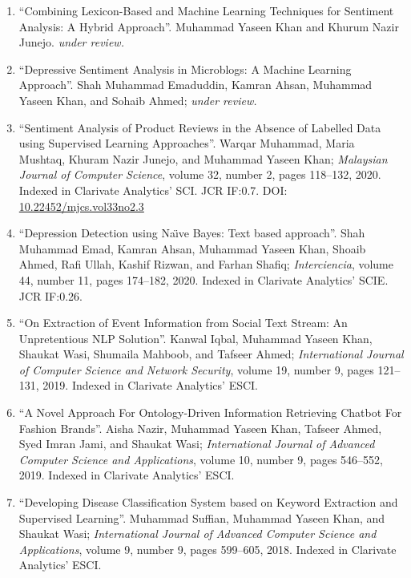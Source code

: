 \documentclass[a4paper, 10pt]{article}
\begin{document}
\begin{enumerate}
\itemsep-4pt 
	\item ``Combining Lexicon-Based and Machine Learning Techniques for Sentiment Analysis: A Hybrid Approach''. \textcolor{NavyBlue}{Muhammad Yaseen Khan} and Khurum Nazir Junejo. \emph{\small under review.}
       
	\item ``Depressive Sentiment Analysis in Microblogs: A Machine Learning Approach''. Shah Muhammad Emaduddin, Kamran Ahsan, \textcolor{NavyBlue}{Muhammad Yaseen Khan}, and Sohaib Ahmed; \emph{\small under review.}
       
    \item ``Sentiment Analysis of Product Reviews in the Absence of Labelled Data using Supervised Learning Approaches''. Warqar Muhammad, Maria Mushtaq, Khuram Nazir Junejo, and \textcolor{NavyBlue}{Muhammad Yaseen Khan}; \emph{Malaysian Journal of Computer Science}, volume 32, number 2, pages 118--132, 2020. Indexed in Clarivate Analytics' SCI. JCR IF:0.7. DOI: \href{10.22452/mjcs.vol33no2.3}{10.22452/mjcs.vol33no2.3}
    
    \item ``Depression Detection using Na\"{\i}ve Bayes: Text based approach''. Shah Muhammad Emad, Kamran Ahsan, \textcolor{NavyBlue}{Muhammad Yaseen Khan}, Shoaib Ahmed, Rafi Ullah, Kashif Rizwan, and Farhan Shafiq; \emph{Interciencia}, volume 44, number 11, pages 174--182, 2020. Indexed in Clarivate Analytics' SCIE. JCR IF:0.26.
	
	\item ``On Extraction of Event Information from Social Text Stream: An Unpretentious NLP Solution''. Kanwal Iqbal, \textcolor{NavyBlue}{Muhammad Yaseen Khan}, Shaukat Wasi, Shumaila Mahboob, and Tafseer Ahmed; \emph{International Journal of Computer Science and Network Security}, volume 19, number 9, pages 121--131, 2019. Indexed in Clarivate Analytics' ESCI.
 
	\item ``A Novel Approach For Ontology-Driven Information Retrieving Chatbot For Fashion Brands''. Aisha Nazir, \textcolor{NavyBlue}{Muhammad Yaseen Khan}, Tafseer Ahmed, Syed Imran Jami, and Shaukat Wasi; \emph{International Journal of Advanced Computer Science and Applications}, volume 10, number 9, pages 546--552, 2019. Indexed in Clarivate Analytics' ESCI. 
      
	\item ``Developing Disease Classification System based on Keyword Extraction and Supervised Learning''. Muhammad Suffian, \textcolor{NavyBlue}{Muhammad Yaseen Khan}, and Shaukat Wasi; \emph{International Journal of Advanced Computer Science and Applications}, volume 9, number 9, pages 599--605, 2018. Indexed in Clarivate Analytics' ESCI.
\end{enumerate}
\end{document}
